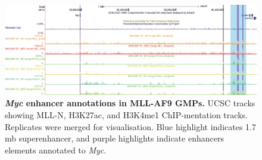 
\begin{figure}[p]
    \centering
    \includegraphics[width=\textwidth,height=\textheight,keepaspectratio]{figures/appendix/app_myc-annotation.png}
    \caption[{\textit{Myc} enhancer annotations in MLL-AF9 GMPs.}]
    {\textbf{\textit{Myc} enhancer annotations in MLL-AF9 GMPs.} 
    UCSC tracks showing MLL-N, H3K27ac, and H3K4me1 ChIP-mentation tracks. Replicates were merged for visualisation. Blue highlight indicates 1.7 mb superenhancer, and purple highlights indicate enhancers elements annotated to \textit{Myc}.
    }
    \label{fig:app_myc-annotation}
\end{figure}





